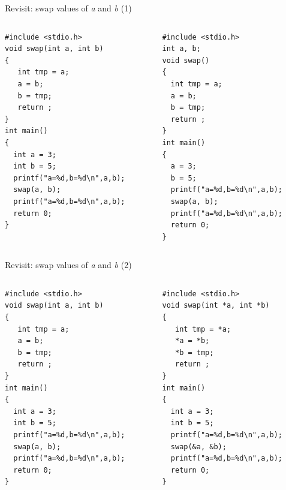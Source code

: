 \begin{frame}[fragile]{Revisit: swap values of \textit{a} and \textit{b} (1)}
\vspace{-0.25in}
\begin{columns}
\begin{column}{0.47\linewidth}
\begin{lstlisting}
#include <stdio.h>
void swap(int a, int b)
{
   int tmp = a;
   a = b;
   b = tmp;
   return ;
}
int main()
{
  int a = 3; 
  int b = 5;
  printf("a=%d,b=%d\n",a,b);
  swap(a, b);
  printf("a=%d,b=%d\n",a,b);
  return 0;
}
\end{lstlisting}
\end{column}
\begin{column}{0.47\linewidth}
\begin{lstlisting}[xleftmargin=0.005\linewidth]
#include <stdio.h>
int a, b;
void swap()
{
  int tmp = a;
  a = b;
  b = tmp;
  return ;
}
int main()
{
  a = 3; 
  b = 5;
  printf("a=%d,b=%d\n",a,b);
  swap(a, b);
  printf("a=%d,b=%d\n",a,b);
  return 0;
}
\end{lstlisting}
\end{column}
\end{columns}
\end{frame}

\begin{frame}[fragile]{Revisit: swap values of \textit{a} and \textit{b} (2)}
\vspace{-0.25in}
\begin{columns}
\begin{column}{0.47\linewidth}
\begin{lstlisting}
#include <stdio.h>
void swap(int a, int b)
{
   int tmp = a;
   a = b;
   b = tmp;
   return ;
}
int main()
{
  int a = 3; 
  int b = 5;
  printf("a=%d,b=%d\n",a,b);
  swap(a, b);
  printf("a=%d,b=%d\n",a,b);
  return 0;
}
\end{lstlisting}
\end{column}
\begin{column}{0.47\linewidth}
\begin{lstlisting}[xleftmargin=0.005\linewidth]
#include <stdio.h>
void swap(int *a, int *b)
{
   int tmp = *a;
   *a = *b;
   *b = tmp;
   return ;
}
int main()
{
  int a = 3; 
  int b = 5;
  printf("a=%d,b=%d\n",a,b);
  swap(&a, &b);
  printf("a=%d,b=%d\n",a,b);
  return 0;
}
\end{lstlisting}
\end{column}
\end{columns}
\end{frame}

